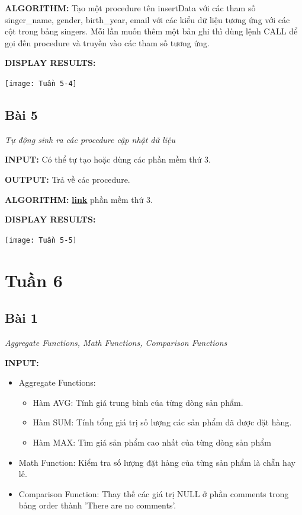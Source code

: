 \documentclass[12pt,a4paper]{report}
\begin{document}
	{\bf ALGORITHM:} Tạo một procedure tên insertData với các tham số singer\_name, gender, birth\_year, email với các kiểu dữ liệu tương ứng với các cột trong bảng singers. Mỗi lần muốn thêm một bản ghi thì dùng lệnh CALL để gọi đến procedure và truyền vào các tham số tương ứng.
	
	{\bf DISPLAY RESULTS:}
		\begin{center}
			\texttt{[image: Tuần 5-4]}
		\end{center}
\subsection{Bài 5}
	\begin{center}
		{\it Tự động sinh ra các procedure cập nhật dữ liệu}
	\end{center}
	
	{\bf INPUT:} Có thể tự tạo hoặc dùng các phần mềm thứ 3.
	
	{\bf OUTPUT:} Trả về các procedure.
	
	{\bf ALGORITHM:} \href{https://www.llblgen.com/pages/try.aspx?fbclid=IwAR1zVfQ_Wl1u3skSk_6MwPPMzrEpesGEHIDsWG02DGN9ShaHMOrnvZBKEu8}{\bf link} phần mềm thứ 3.
	
	{\bf DISPLAY RESULTS:}
		\begin{center}
			\texttt{[image: Tuần 5-5]}
		\end{center}


\newpage
\section{Tuần 6}
\subsection{Bài 1}
	\begin{center}
		{\it Aggregate Functions, Math Functions, Comparison Functions}
	\end{center}
	
	{\bf INPUT:}
	\begin{itemize}
		\item Aggregate Functions:
		\begin{itemize}
			\item Hàm AVG: Tính giá trung bình của từng dòng sản phẩm.
			\item Hàm SUM: Tính tổng giá trị số lượng các sản phẩm đã được đặt hàng.
			\item Hàm MAX: Tìm giá sản phẩm cao nhất của từng dòng sản phẩm
		\end{itemize}
		\item Math Function: Kiểm tra số lượng đặt hàng của từng sản phẩm là chẵn hay lẻ.
		\item Comparison Function: Thay thế các giá trị NULL ở phần comments trong bảng order thành 'There are no comments'.
	\end{itemize}
	
\end{document}
